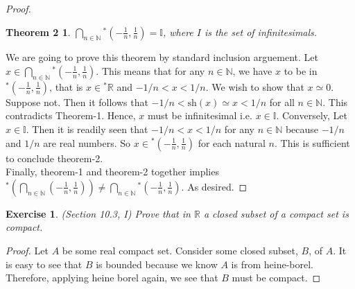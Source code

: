 \documentclass[a4paper, 11pt, openany]{book}
\theoremstyle{plain}
\newtheorem{exercise}{Exercise}[chapter]
\newtheorem*{theorem2}{Theorem 2}
\theoremstyle{plain}
\newcommand{\N}{\mathbb{N}}
\newcommand{\R}{\mathbb{R}}
\newcommand{\I}{\mathbb{I}}
\newcommand{\hyp}{{}^*}
\newcommand{\sh}{\text{sh}}
\begin{document}
\begin{proof}
      \begin{theorem2}
        $\bigcap_{n \in \N} \hyp \left( -\frac{1}{n}, \frac{1}{n} \right) = \I$, where $I$ is the set of infinitesimals.
      \end{theorem2}
      We are going to prove this theorem by standard inclusion arguement. Let $x \in \bigcap_{n \in \N} \hyp \left( -\frac{1}{n}, \frac{1}{n} \right)$. This means that for any $n \in \N$, we have $x$ to be in $\hyp \left( -\frac{1}{n}, \frac{1}{n} \right)$, that is $x \in \hyp \R$ and $-1/n<x<1/n$. We wish to show that $x \simeq 0$. Suppose not. Then it follows that $-1/n <\sh(x) \simeq x<1/n$ for all $n \in \N$. This contradicts Theorem-1. Hence, $x$ must be infinitesimal i.e. $x \in \I$. Conversely, Let $x \in \I$. Then it is readily seen that $-1/n<x<1/n$ for any $n \in \N$ because $-1/n$ and $1/n$ are real numbers. So $x \in \hyp \left( -\frac{1}{n}, \frac{1}{n} \right)$ for each natural $n$. This is sufficient to conclude theorem-2. \\

      Finally, theorem-1 and theorem-2 together implies $\hyp \left( \bigcap_{n \in \N} \left(-\frac{1}{n}, \frac{1}{n}\right) \right) \not = \bigcap_{n \in \N} \hyp \left( - \frac{1}{n}, \frac{1}{n} \right)$. As desired.
    \end{proof}

    \begin{exercise}
      (Section 10.3, I)
      Prove that in $\R$ a closed subset of a compact set is compact.
    \end{exercise}
    \begin{proof}
      Let $A$ be some real compact set. Consider some closed subset, $B$, of $A$. It is easy to see that $B$ is bounded because we know $A$ is from heine-borel. Therefore, applying heine borel again, we see that $B$ must be compact.
    \end{proof}
\end{document}
